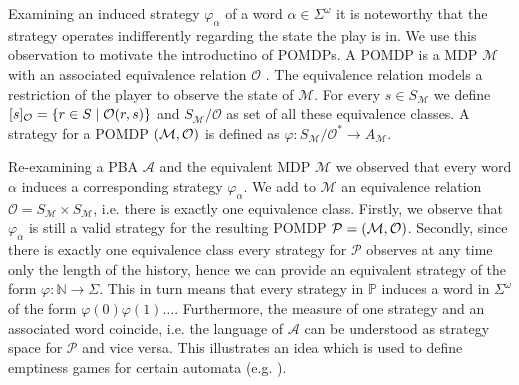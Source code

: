 Examining an induced strategy $\varphi_{\alpha}$ of a word
$\alpha\in\Sigma^{\omega}$ it is noteworthy that the strategy operates
indifferently regarding the state the play is in. We use this observation to
motivate the introductino of \acp{POMDP}. A \ac{POMDP} is a \ac{MDP}
$\mathcal{M}$ with an associated equivalence relation $\mathcal{O}$
\cite{RandAutoInfTrees}. The equivalence relation models a restriction of the
player to observe the state of $\mathcal{M}$. For every
$s\in S_{\mathcal{M}}$ we define
$[s]_{\mathcal{O}} = \left\{r\in S\mid \mathcal{O}(r,s)\right\}$ and
$S_{\mathcal{M}}/\mathcal{O}$ as set of all these equivalence classes. A
strategy for a \ac{POMDP} $\left(\mathcal{M}, \mathcal{O}\right)$ is defined as
$\varphi:S_{\mathcal{M}}/\mathcal{O}^{*}\rightarrow A_{\mathcal{M}}$.
\begin{example}
  Re-examining a \ac{PBA} $\mathcal{A}$ and the equivalent \ac{MDP}
  $\mathcal{M}$ we observed that every word $\alpha$ induces a corresponding
  strategy $\varphi_{\alpha}$. We add to $\mathcal{M}$ an equivalence relation
  $\mathcal{O} = S_{\mathcal{M}} \times S_{\mathcal{M}}$, i.e. there is exactly
  one equivalence class. Firstly, we observe that $\varphi_{\alpha}$ is still a
  valid strategy for the resulting \ac{POMDP}
  $\mathcal{P} = \left(\mathcal{M}, \mathcal{O}\right)$. Secondly, since there is
  exactly one equivalence class every strategy for $\mathcal{P}$ observes at
  any time only the length of the history, hence we can provide an equivalent
  strategy of the form $\varphi:\mathbb{N}\rightarrow \Sigma$. This in turn
  means that every strategy in $\mathbb{P}$ induces a word in $\Sigma^{\omega}$
  of the form $\varphi(0)\varphi(1)\dots$. Furthermore, the measure of one
  strategy and an associated word coincide, i.e. the language of $\mathcal{A}$
  can be understood as strategy space for $\mathcal{P}$ and vice versa. This
  illustrates an idea which is used to define emptiness games for certain
  automata (e.g. \cite[Proposition 45]{RandAutoInfTrees}).
\end{example}


